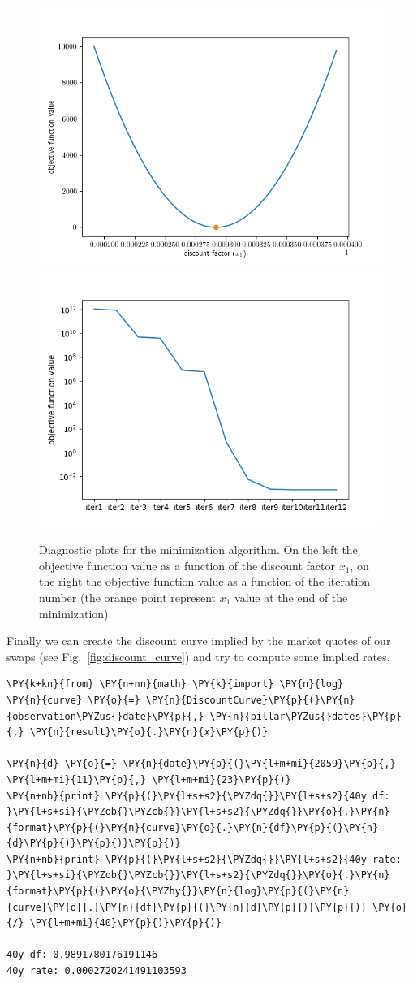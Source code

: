 \begin{figure}[htb]
  \centering
  \includegraphics[width=0.45\linewidth]{figures/obj_func.png}
  \includegraphics[width=0.45\linewidth]{figures/obj_func_iter.png}
  \caption{Diagnostic plots for the minimization algorithm. On the left the objective function value as a function of the discount factor $x_1$, on the right the objective function value as a function of the iteration number (the orange point represent $x_1$ value at the end of the minimization).}
  \label{fig:minimization_diagnostic}
\end{figure}

Finally we can create the discount curve implied by the market quotes of
our swaps (see Fig.~\ref{fig:discount_curve}) and try to compute some implied rates.

\begin{tcolorbox}[breakable, size=fbox, boxrule=1pt, pad at break*=1mm,colback=cellbackground, colframe=cellborder]
\begin{Verbatim}[commandchars=\\\{\}]
\PY{k+kn}{from} \PY{n+nn}{math} \PY{k}{import} \PY{n}{log}
\PY{n}{curve} \PY{o}{=} \PY{n}{DiscountCurve}\PY{p}{(}\PY{n}{observation\PYZus{}date}\PY{p}{,} \PY{n}{pillar\PYZus{}dates}\PY{p}{,} \PY{n}{result}\PY{o}{.}\PY{n}{x}\PY{p}{)}

\PY{n}{d} \PY{o}{=} \PY{n}{date}\PY{p}{(}\PY{l+m+mi}{2059}\PY{p}{,} \PY{l+m+mi}{11}\PY{p}{,} \PY{l+m+mi}{23}\PY{p}{)}
\PY{n+nb}{print} \PY{p}{(}\PY{l+s+s2}{\PYZdq{}}\PY{l+s+s2}{40y df: }\PY{l+s+si}{\PYZob{}\PYZcb{}}\PY{l+s+s2}{\PYZdq{}}\PY{o}{.}\PY{n}{format}\PY{p}{(}\PY{n}{curve}\PY{o}{.}\PY{n}{df}\PY{p}{(}\PY{n}{d}\PY{p}{)}\PY{p}{)}\PY{p}{)}
\PY{n+nb}{print} \PY{p}{(}\PY{l+s+s2}{\PYZdq{}}\PY{l+s+s2}{40y rate: }\PY{l+s+si}{\PYZob{}\PYZcb{}}\PY{l+s+s2}{\PYZdq{}}\PY{o}{.}\PY{n}{format}\PY{p}{(}\PY{o}{\PYZhy{}}\PY{n}{log}\PY{p}{(}\PY{n}{curve}\PY{o}{.}\PY{n}{df}\PY{p}{(}\PY{n}{d}\PY{p}{)}\PY{p}{)} \PY{o}{/} \PY{l+m+mi}{40}\PY{p}{)}\PY{p}{)}             

40y df: 0.9891780176191146
40y rate: 0.0002720241491103593
    \end{Verbatim}
\end{tcolorbox}

